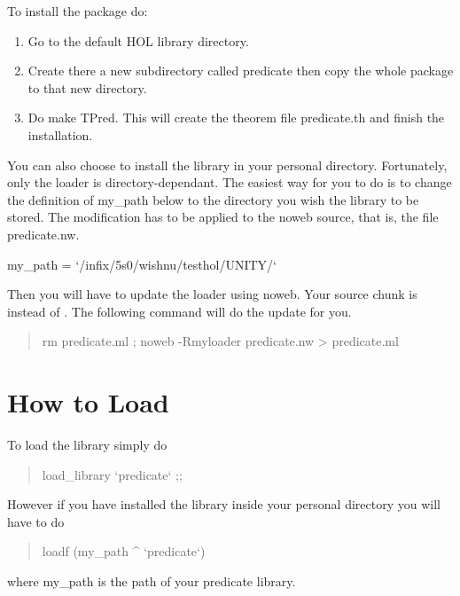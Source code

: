 To install the package do:
\begin{enumerate}
\item
Go to the default HOL library directory.

\item
Create there a new subdirectory called \code{}predicate\edoc{} then copy the
whole package to that new directory.

\item
Do \code{}make TPred\edoc{}. This will create the theorem file
\code{}predicate.th\edoc{} and finish the installation. 
\end{enumerate}

You can also choose to install the library in your personal directory.
Fortunately, only the loader is directory-dependant. The easiest way
for you to do is to change the definition of \code{}my_path\edoc{} below to the
directory you wish the library to be stored. The modification has to
be applied to the \code{}noweb\edoc{} source, that is, the file
\code{}predicate.nw\edoc{}.

\enddocs
{}
\endmoddef
my_path = `/infix/5s0/wishnu/testhol/UNITY/`  
\endcode
{}


Then you will have to update the loader using \code{}noweb\edoc{}. Your source
chunk is  instead of . The
following command will do the update for you.
\begin{quote}
   \code{}rm predicate.ml ; noweb -Rmyloader predicate.nw > predicate.ml \edoc{}
\end{quote}

\enddocs
{}

\section{How to Load}

To load the library simply do
\begin{quotation}
   \code{}load_library `predicate` ;;\edoc{}
\end{quotation}
However if you have installed the library inside your personal directory
you will have to do 
\begin{quotation}
   \code{}loadf (my_path ^ `predicate`)\edoc{}
\end{quotation}
where \code{}my_path\edoc{} is the path of your \code{}predicate\edoc{} library.



\enddocs
{}

